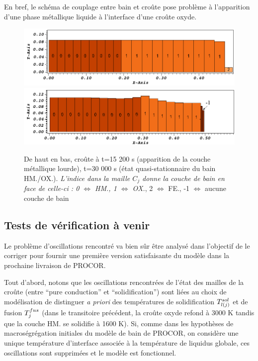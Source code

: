 En bref, le schéma de couplage entre bain et croûte pose problème à l'apparition d'une phase métallique liquide à l'interface d'une croûte oxyde.

\begin{figure}[H]
\centering
\includegraphics[width=\textwidth, keepaspectratio=true]{Figures/coriumCrust_15200.png} \\
\includegraphics[width=\textwidth, keepaspectratio=true]{Figures/coriumCrust_30000.png}
\caption{De haut en bas, croûte à t=15 200 s (apparition de la couche métallique lourde), t=30 000 s (état quasi-stationnaire du bain HM./OX.). \textit{L'indice dans la maille $C_j$ donne la couche de bain en face de celle-ci : 0 $\Leftrightarrow$ HM., 1 $\Leftrightarrow$ OX.}, 2  $\Leftrightarrow$ FE., -1 $\Leftrightarrow$ aucune couche de bain}
\label{fig:croutes_2}
\end{figure}

\subsection{Tests de vérification à venir}\label{sect:verif}

Le problème d'oscillations rencontré va bien sûr être analysé dans l'objectif de le corriger pour fournir une première version satisfaisante du modèle dans la prochaine livraison de PROCOR.

Tout d'abord, notons que les oscillations rencontrées de l'état des mailles de la croûte (entre ``pure conduction'' et ``solidification'') sont liées au choix de modélisation de distinguer \textit{a priori} des températures de solidification $\temperature[sol]{l(j)}$ et de fusion $\temperature[fus]{j}$ (dans le transitoire précédent, la croûte oxyde refond à 3000 K tandis que la couche HM. se solidifie à 1600 K). Si, comme dans les hypothèses de macroségrégation initiales du modèle de bain de PROCOR, on considère une unique température d'interface associée à la température de liquidus globale, ces oscillations sont supprimées et le modèle est fonctionnel.

